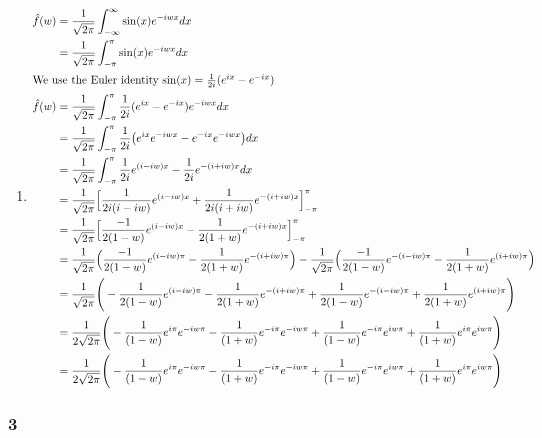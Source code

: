 \documentclass[a4paper]{article}
\newcommand{\ex}[1]{\subsubsection*{#1}}
\begin{document}
\begin{enumerate}[label=\alph*)]
    \item {
        \begin{align}
            \hat f(w) &= \frac{1}{\sqrt{2\pi}} \int_{-\infty}^\infty{ 
                \sin(x) e^{-iwx} dx} \\
            &= \frac{1}{\sqrt{2\pi}} \int_{-\pi}^\pi{\sin(x) e^{-iwx} dx} \\
            \intertext{We use the Euler identity \(\sin(x) = \frac{1}{2i}(e^{ix}
                - e^{-ix})\)}
            \hat f(w) &= \frac{1}{\sqrt{2\pi}} \int_{-\pi}^\pi{ \frac{1}{2i}(e^{ix}
                - e^{-ix}) e^{-iwx} dx} \\
            &= \frac{1}{\sqrt{2\pi}} \int_{-\pi}^\pi{ \frac{1}{2i}\big( e^{ix}e^{-iwx}
                - e^{-ix} e^{-iwx}\big) dx} \\
            &= \frac{1}{\sqrt{2\pi}} \int_{-\pi}^\pi{ \frac{1}{2i} e^{(i-iw)x}
                - \frac{1}{2i} e^{-(i+iw)x} dx} \\
            &= \frac{1}{\sqrt{2\pi}} \Big[\frac{1}{2i(i-iw)} e^{(i-iw)x} 
                + \frac{1}{2i(i+iw)} e^{-(i+iw)x} \Big]_{-\pi}^\pi \\
            &= \frac{1}{\sqrt{2\pi}} \Big[\frac{-1}{2(1-w)} e^{(i-iw)x} 
                - \frac{1}{2(1+w)} e^{-(i+iw)x} \Big]_{-\pi}^\pi \\
            &= \frac{1}{\sqrt{2\pi}} \Big(\frac{-1}{2(1-w)} e^{(i-iw)\pi} 
                - \frac{1}{2(1+w)} e^{-(i+iw)\pi} \Big)
                - \frac{1}{\sqrt{2\pi}} \Big(\frac{-1}{2(1-w)} e^{-(i-iw)\pi} 
                - \frac{1}{2(1+w)} e^{(i+iw)\pi} \Big) \\
            &= \frac{1}{\sqrt{2\pi}} \Bigg( 
                - \frac{1}{2(1-w)} e^{(i-iw)\pi} 
                - \frac{1}{2(1+w)} e^{-(i+iw)\pi} 
                + \frac{1}{2(1-w)} e^{-(i-iw)\pi} 
                + \frac{1}{2(1+w)} e^{(i+iw)\pi} \Bigg) \\
            &= \frac{1}{2\sqrt{2\pi}} \Bigg( 
                - \frac{1}{(1-w)} e^{i\pi}e^{-iw\pi} 
                - \frac{1}{(1+w)} e^{-i\pi}e^{-iw\pi} 
                + \frac{1}{(1-w)} e^{-i\pi}e^{iw\pi} 
                + \frac{1}{(1+w)} e^{i\pi}e^{iw\pi} \Bigg) \\
            &= \frac{1}{2\sqrt{2\pi}} \Bigg( 
                - \frac{1}{(1-w)} e^{i\pi}e^{-iw\pi} 
                - \frac{1}{(1+w)} e^{-i\pi}e^{-iw\pi} 
                + \frac{1}{(1-w)} e^{-i\pi}e^{iw\pi} 
                + \frac{1}{(1+w)} e^{i\pi}e^{iw\pi} \Bigg) \\
        \end{align}
    }
\end{enumerate}

\ex{3}
\end{document}
